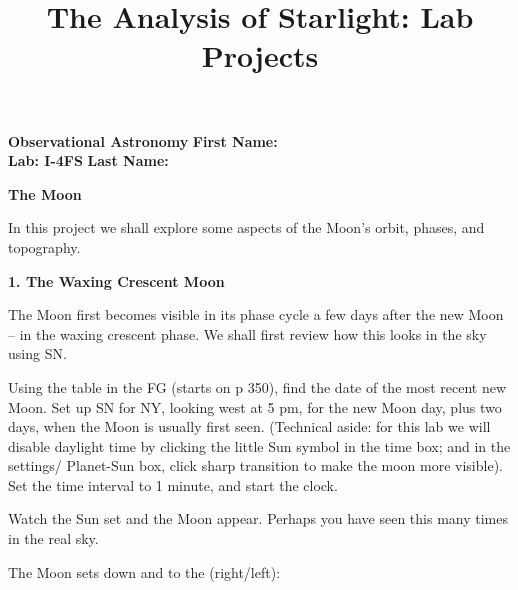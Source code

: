 \documentclass[12pt]{article}
\title{The Analysis of Starlight: Lab Projects}
\begin{document}
\setcounter{page}{1}
\setcounter{equation}{0}
\pagestyle{plain}
\thispagestyle{empty}  %
\newcommand{\kms}{\hbox{km\,s$^{\rm -1}$}}
\def\lo {\ifmmode {\,{\it L}\solar} \else $\,L$\solar\fi}       %
\def\my {\ifmmode {\,{\it M}\solar\,{\rm yr^{-1}}}              %
        \else {$\,M$\solar$\,$yr$^{\rm -1}$}\fi}
\def\arcsec{\ifmmode {^{\scriptscriptstyle\prime\prime}}
          \else $^{\scriptscriptstyle\prime\prime}$\fi}
\def\arcmin{\ifmmode {^{\scriptscriptstyle\prime}}
          \else $^{\scriptscriptstyle\prime}$\fi}
\def\deg{\ifmmode^\circ\else$^\circ$\fi}





\noindent
{\bf Observational Astronomy    \hfill} {\bf First Name:\makebox[4cm]{\hrulefill}}\\
{\bf Lab: I-4FS} \hfill {\bf Last Name:\makebox[4cm]{\hrulefill}}


\bigskip

\medskip

\noindent
{\hfill \Large {\bf The Moon} \hfill}


\bigskip

\noindent
In this project we shall explore some aspects of the Moon's orbit,
phases, and topography.


\medskip \bigskip
\noindent
{\bf 1. The Waxing Crescent Moon}

\medskip\noindent The Moon first becomes visible in its phase cycle a
few days after the new Moon -- in the waxing crescent phase. 
We shall first review how this looks in
the sky using SN.

Using the table in the FG (starts on p 350), find the date of the most
recent new Moon. Set up SN for NY, looking west at 5 pm, for the new
Moon day, plus two days, when the Moon is usually first
seen. (Technical aside: for this lab we will disable daylight time by
clicking the little Sun symbol in the time box; and in the settings/
Planet-Sun box, click sharp transition to make the moon more visible).
Set the time interval to 1 minute, and start the clock.

Watch the Sun set and the Moon appear. Perhaps you have seen this many
times in the real sky.

\medskip
The Moon sets down and to the (right/left): \makebox[2cm]{\hrulefill}
\end{document}
